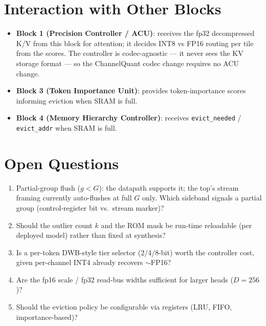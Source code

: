 \documentclass[11pt]{article}
\begin{document}
\section{Interaction with Other Blocks}
\label{sec:interaction}

\begin{itemize}
\item \textbf{Block 1 (Precision Controller / ACU)}: receives the fp32
      decompressed K/V from this block for attention; it decides INT8 vs FP16
      routing per tile from the scores. The controller is codec-agnostic --- it
      never sees the KV storage format --- so the ChannelQuant codec change
      requires no ACU change.
\item \textbf{Block 3 (Token Importance Unit)}: provides token-importance scores
      informing eviction when SRAM is full.
\item \textbf{Block 4 (Memory Hierarchy Controller)}: receives
      \texttt{evict\_needed} / \texttt{evict\_addr} when SRAM is full.
\end{itemize}

\section{Open Questions}
\label{sec:open}

\begin{enumerate}
\item Partial-group flush ($g<G$): the datapath supports it; the top's stream
      framing currently auto-flushes at full $G$ only. Which sideband signals a
      partial group (control-register bit vs.\ stream marker)?
\item Should the outlier count $k$ and the ROM mask be run-time reloadable
      (per deployed model) rather than fixed at synthesis?
\item Is a per-token DWB-style tier selector (2/4/8-bit) worth the controller
      cost, given per-channel INT4 already recovers $\sim$FP16?
\item Are the fp16 scale / fp32 read-bus widths sufficient for larger heads
      ($D=256$)?
\item Should the eviction policy be configurable via registers (LRU, FIFO,
      importance-based)?
\end{enumerate}

\end{document}
